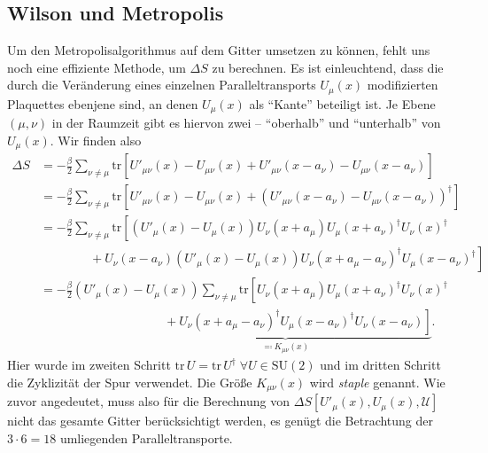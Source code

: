 \subsection{Wilson und Metropolis} \label{sec:wilsonMetropolis}
Um den Metropolisalgorithmus auf dem Gitter umsetzen zu können, fehlt uns noch eine
effiziente Methode, um $\Delta S$ zu berechnen. Es ist einleuchtend, dass die durch
die Veränderung eines einzelnen Paralleltransports $U_\mu(x)$ modifizierten Plaquettes
ebenjene sind, an denen $U_\mu(x)$ als \enquote{Kante} beteiligt ist. Je Ebene
$(\mu, \nu)$ in der Raumzeit gibt es hiervon zwei -- \enquote{oberhalb} und
\enquote{unterhalb} von $U_\mu(x)$. Wir finden also
\begin{align*}
    \Delta S &= -\frac{\beta}{2} \sum_{\nu \neq \mu} \mathrm{tr} \left[ \right.
        U'_{\mu \nu}(x) - U_{\mu \nu}(x)
        + U'_{\mu \nu}(x - a_\nu) - U_{\mu \nu}(x - a_\nu) \left. \right] \\
    &= -\frac{\beta}{2} \sum_{\nu \neq \mu} \mathrm{tr} \left[ \right.
        U'_{\mu \nu}(x) - U_{\mu \nu}(x)
        + (U'_{\mu \nu}(x - a_\nu) - U_{\mu \nu}(x - a_\nu))^\dag \left. \right] \\
    &= -\frac{\beta}{2} \sum_{\nu \neq \mu} \mathrm{tr} \left[ \right.
       (U'_\mu(x) - U_\mu(x)) U_\nu(x + a_\mu) U_\mu(x + a_\nu)^\dag U_\nu(x)^\dag \\
    & \qquad \qquad + U_\nu(x - a_\nu) (U'_\mu(x) - U_\mu(x))
    U_\nu(x + a_\mu - a_\nu)^\dag U_\mu(x - a_\nu)^\dag \left. \right] \\
    &= -\frac{\beta}{2} (U'_\mu(x) - U_\mu(x)) \sum_{\nu \neq \mu}
    \text{tr} \left[ \right. U_\nu(x + a_\mu) U_\mu(x + a_\nu)^\dag U_\nu(x)^\dag \\
    & \qquad \qquad \qquad  \qquad \underbrace{\qquad+ U_\nu(x + a_\mu - a_\nu)^\dag
    U_\mu(x - a_\nu)^\dag
    U_\nu(x - a_\nu) \left. \right]}_{\eqqcolon K_{\mu \nu}(x)}.
\end{align*}
Hier wurde im zweiten Schritt
$\text{tr} \, U = \text{tr} \, U^\dag \; \forall U \in \text{SU}(2)$
und im dritten Schritt die Zyklizität der Spur verwendet. Die Größe $K_{\mu \nu}(x)$
wird \emph{staple} genannt. Wie zuvor angedeutet, muss also für die Berechnung von
$\Delta S [U'_\mu(x), U_\mu(x), \mathcal{U}]$ nicht das gesamte Gitter berücksichtigt
werden, es
genügt die Betrachtung der $3 \cdot 6 = 18$ umliegenden Paralleltransporte.


